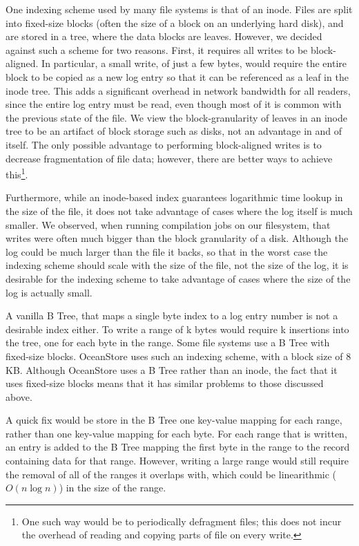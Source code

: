\documentclass{acm_proc_article-sp}
\begin{document}
One indexing scheme used by many file systems is that of an inode. Files are split into fixed-size blocks (often the size of a block on an underlying hard disk), and are stored in a tree, where the data blocks are leaves. However, we decided against such a scheme for two reasons. First, it requires all writes to be block-aligned. In particular, a small write, of just a few bytes, would require the entire block to be copied as a new log entry so that it can be referenced as a leaf in the inode tree. This adds a significant overhead in network bandwidth for all readers, since the entire log entry must be read, even though most of it is common with the previous state of the file. We view the block-granularity of leaves in an inode tree to be an artifact of block storage such as disks, not an advantage in and of itself. The only possible advantage to performing block-aligned writes is to decrease fragmentation of file data; however, there are better ways to achieve this\footnote{One such way would be to periodically defragment files; this does not incur the overhead of reading and copying parts of file on every write.}. 

Furthermore, while an inode-based index guarantees logarithmic time lookup in the size of the file, it does not take advantage of cases where the log itself is much smaller. We observed, when running compilation jobs on our filesystem, that writes were often much bigger than the block granularity of a disk. Although the log could be much larger than the file it backs, so that in the worst case the indexing scheme should scale with the size of the file, not the size of the log, it is desirable for the indexing scheme to take advantage of cases where the size of the log is actually small.

A vanilla B Tree, that maps a single byte index to a log entry number is not a desirable index either. To write a range of k bytes would require k insertions into the tree, one for each byte in the range. Some file systems use a B Tree with fixed-size blocks. OceanStore \cite{OceanStore} uses such an indexing scheme, with a block size of 8 KB. Although OceanStore uses a B Tree rather than an inode, the fact that it uses fixed-size blocks means that it has similar problems to those discussed above.

A quick fix would be store in the B Tree one key-value mapping for each range, rather than one key-value mapping for each byte. For each range that is written, an entry is added to the B Tree mapping the first byte in the range to the record containing data for that range. However, writing a large range would still require the removal of all of the ranges it overlaps with, which could be linearithmic ($O(n\log n)$) in the size of the range.
\end{document}
